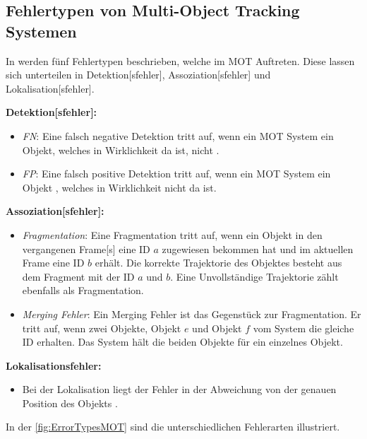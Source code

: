 \clearpage
\subsection{Fehlertypen von Multi-Object Tracking Systemen} \label{sec:MOT Fehlertypen}
In \cite{Leichter.2013} werden fünf Fehlertypen beschrieben, welche im \gls{MOT} Auftreten. Diese lassen sich unterteilen in \gls{Detektion}[sfehler], \gls{Assoziation}[sfehler] und \gls{Lokalisation}[sfehler]. \par

\textbf{\gls{Detektion}[sfehler]:}
\begin{itemize}
    \item \textit{\gls{FN}}: Eine falsch negative \gls{Detektion} tritt auf, wenn ein \gls{MOT} System ein Objekt, welches in Wirklichkeit da ist, nicht .
    \item \textit{\gls{FP}}: Eine falsch positive \gls{Detektion} tritt auf, wenn ein \gls{MOT} System ein Objekt , welches in Wirklichkeit nicht da ist.
\end{itemize}

\textbf{\gls{Assoziation}[sfehler]:}
\begin{itemize}
    \item \textit{\gls{Fragmentation}}: Eine Fragmentation tritt auf, wenn ein Objekt in den vergangenen \gls{Frame}[s] eine \acrshort{ID} \(a\) zugewiesen bekommen hat und im aktuellen \gls{Frame} eine \acrshort{ID} \(b\) erhält. Die korrekte \gls{Trajektorie} des Objektes besteht aus dem Fragment mit der \acrshort{ID} \(a\) und \(b\). Eine Unvollständige \gls{Trajektorie} zählt ebenfalls als Fragmentation. 
    \item \textit{\gls{Merging Fehler}}: Ein Merging Fehler ist das Gegenstück zur Fragmentation. Er tritt auf, wenn zwei Objekte, Objekt \(e\) und Objekt \(f\) vom System die gleiche \acrshort{ID} erhalten. Das System hält die beiden Objekte für ein einzelnes Objekt. 
\end{itemize}

\textbf{\gls{Lokalisationsfehler}:}
\begin{itemize}
    \item Bei der \gls{Lokalisation} liegt der Fehler in der Abweichung von der genauen Position des Objekts \cite{Leichter.2013}. \par
\end{itemize}

In der \autoref{fig:ErrorTypesMOT} sind die unterschiedlichen Fehlerarten illustriert. 



